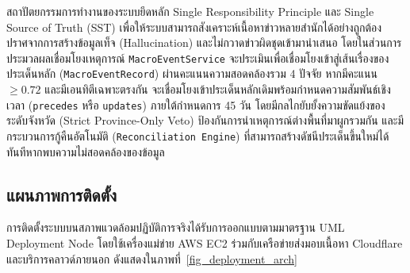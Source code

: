 สถาปัตยกรรมการทำงานของระบบยึดหลัก Single Responsibility Principle และ Single Source of Truth (SST) เพื่อให้ระบบสามารถสังเคราะห์เนื้อหาข่าวหลายสำนักได้อย่างถูกต้อง ปราศจากการสร้างข้อมูลเท็จ (Hallucination) และไม่กวาดข่าวผิดชุดเข้ามานำเสนอ โดยในส่วนการประมวลผลเชื่อมโยงเหตุการณ์ \texttt{MacroEventService} จะประเมินเพื่อเชื่อมโยงเข้าสู่เส้นเรื่องของประเด็นหลัก (\texttt{MacroEventRecord}) ผ่านคะแนนความสอดคล้องรวม 4 ปัจจัย หากมีคะแนน $\ge 0.72$ และมีเอนทิตีเฉพาะตรงกัน จะเชื่อมโยงเข้าประเด็นหลักเดิมพร้อมกำหนดความสัมพันธ์เชิงเวลา (\texttt{precedes} หรือ \texttt{updates}) ภายใต้กำหนดการ 45 วัน โดยมีกลไกยับยั้งความขัดแย้งของระดับจังหวัด (Strict Province-Only Veto) ป้องกันการนำเหตุการณ์ต่างพื้นที่มาผูกรวมกัน และมีกระบวนการกู้คืนอัตโนมัติ (\texttt{Reconciliation Engine}) ที่สามารถสร้างดัชนีประเด็นขึ้นใหม่ได้ทันทีหากพบความไม่สอดคล้องของข้อมูล

\subsection{แผนภาพการติดตั้ง}

การติดตั้งระบบบนสภาพแวดล้อมปฏิบัติการจริงได้รับการออกแบบตามมาตรฐาน UML Deployment Node โดยใช้เครื่องแม่ข่าย AWS EC2 ร่วมกับเครือข่ายส่งมอบเนื้อหา Cloudflare และบริการคลาวด์ภายนอก ดังแสดงในภาพที่~\ref{fig_deployment_arch}

